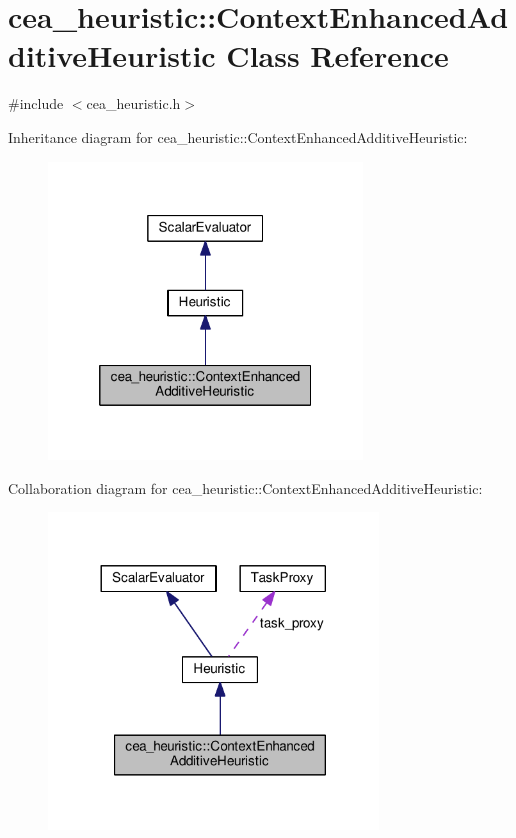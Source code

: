 \hypertarget{classcea__heuristic_1_1ContextEnhancedAdditiveHeuristic}{\section{cea\-\_\-heuristic\-:\-:Context\-Enhanced\-Additive\-Heuristic Class Reference}
\label{classcea__heuristic_1_1ContextEnhancedAdditiveHeuristic}
}


{\ttfamily \#include $<$cea\-\_\-heuristic.\-h$>$}



Inheritance diagram for cea\-\_\-heuristic\-:\-:Context\-Enhanced\-Additive\-Heuristic\-:
\nopagebreak
\begin{figure}[H]
\begin{center}
\leavevmode
\includegraphics[width=236pt]{classcea__heuristic_1_1ContextEnhancedAdditiveHeuristic__inherit__graph}
\end{center}
\end{figure}


Collaboration diagram for cea\-\_\-heuristic\-:\-:Context\-Enhanced\-Additive\-Heuristic\-:
\nopagebreak
\begin{figure}[H]
\begin{center}
\leavevmode
\includegraphics[width=248pt]{classcea__heuristic_1_1ContextEnhancedAdditiveHeuristic__coll__graph}
\end{center}
\end{figure}
